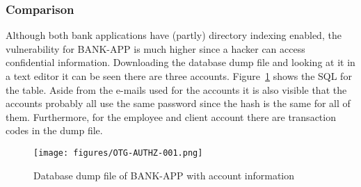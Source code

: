 \subsubsection{Comparison}
Although both bank applications have (partly) directory indexing enabled, the vulnerability for BANK-APP is much higher since a hacker can access confidential information. Downloading the database dump file and looking at it in a text editor it can be seen there are three accounts. Figure~\ref{fig:db_dump} shows the SQL for the  table. Aside from the e-mails used for the accounts it is also visible that the accounts probably all use the same password since the hash is the same for all of them. Furthermore, for the employee and client account there are transaction codes in the dump file.

\begin{figure}[ht]
	\centering
	\texttt{[image: figures/OTG-AUTHZ-001.png]}
	\caption{Database dump file of BANK-APP with account information}
	\label{fig:db_dump}
\end{figure}

\clearpage